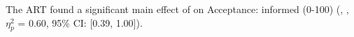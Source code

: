 The ART found a significant main effect of \Phase on Acceptance: informed (0-100) (, , $\eta_{p}^{2}$ = 0.60, 95\% CI: [0.39, 1.00]). 
